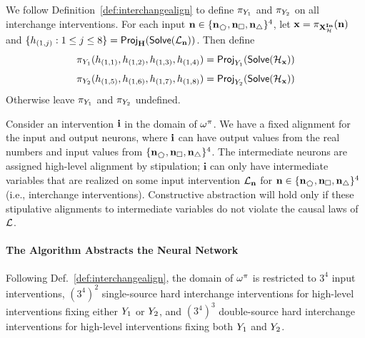 \documentclass[twoside,11pt]{article}
\begin{document}
We follow Definition~\ref{def:interchangealign} to define $\cellfunc_{\onevarr_1}$ and $\cellfunc_{\onevarr_2}$ on all interchange interventions. For each input  $ \inneuronset \in \{\inneuronset_{\pentagon}, \inneuronset_{\square}, \inneuronset_{\bigtriangleup} \}^{4}$, let $\pset = \cellfunc_{\inputvars_{\highmodel}}(\inneuronset)$ and $\{\hiddenneuronval_{(1,j)}: 1 \leq j \leq 8\} = \project{\sols(\lowmodel_{\inneuronset})}{\hiddenneurons}$. Then define 
\[\cellfunc_{\onevarr_1}(\hiddenneuronval_{(1,1)},\hiddenneuronval_{(1,2)}, \hiddenneuronval_{(1,3)},\hiddenneuronval_{(1,4)} ) = \project{\sols(\highmodel_{\pset})} {\onevarr_1}\]
\[\cellfunc_{\onevarr_2}(\hiddenneuronval_{(1,5)},\hiddenneuronval_{(1,6)}, \hiddenneuronval_{(1,7)},\hiddenneuronval_{(1,8)} ) = \project{\sols(\highmodel_{\pset})}{ \onevarr_2}\]
Otherwise leave $\cellfunc_{\onevarr_1}$ and $\cellfunc_{\onevarr_2}$ undefined.

Consider an intervention $\intpset$ in the domain of $\intmap^{\cellfunc}$. We have a fixed alignment for the input and output neurons, where $\intpset$ can have output values from the real numbers and input values from $\{\inneuronset_{\pentagon}, \inneuronset_{\square}, \inneuronset_{\bigtriangleup} \}^{4}$. The intermediate neurons are assigned high-level alignment by stipulation; $\mathbf{i}$ can only have intermediate variables that are realized on some input intervention $\lowmodel_{\inneuronset}$ for $\inneuronset \in \{\inneuronset_{\pentagon}, \inneuronset_{\square}, \inneuronset_{\bigtriangleup} \}^{4}$ (i.e., interchange interventions). Constructive abstraction will hold only if these stipulative alignments to intermediate variables do not violate the causal laws of $\lowmodel$.



\paragraph{The Algorithm Abstracts the Neural Network}\label{ex:abstract} 

Following Def.~\ref{def:interchangealign}, the domain of $\intmap^{\cellfunc}$ is restricted to $3^4$ input interventions, $(3^4)^2$ single-source hard interchange interventions for high-level interventions fixing either $\onevarr_1$ or $\onevarr_2$, and $(3^4)^3$ double-source hard interchange interventions for high-level interventions fixing both $\onevarr_1$ and $\onevarr_2$. 
\end{document}
